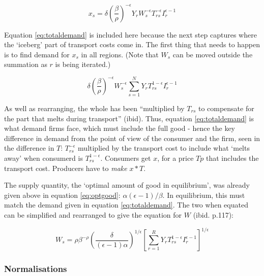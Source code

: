 {\begin{equation}
x_{s} = \delta \left(\frac{\beta}{\rho}\right)^{-\epsilon} Y_{r} W_{s}^{-\epsilon} T_{rs}^{-\epsilon} I_{r}^{\epsilon-1}\label{eq:totaldemand}
\end{equation}

Equation \eqref{eq:totaldemand} is included here because the next step captures where the `iceberg' part of transport costs come in. The first thing that needs to happen is to find demand for $x_{s}$ in all regions. (Note that $W_{s}$ can be moved outside the summation as $r$ is being iterated.)

\begin{equation}
\delta \left(\frac{\beta}{\rho}\right)^{-\epsilon} W_{s}^{-\epsilon} \sum_{s=1}^{N} Y_{r} T_{rs}^{1-\epsilon} I_{r}^{\epsilon-1}\label{eq:totaldemand}
\end{equation}

As well as rearranging, the whole has been ``multiplied by $T_{rs}$ to compensate for the part that melts during transport'' (ibid). Thus, equation \eqref{eq:totaldemand} is what demand firms face, which must include the full good - hence the key difference in demand from the point of view of the consumer and the firm, seen in the difference in $T$: $T_{rs}^{-\epsilon}$ multiplied by the transport cost to include what `melts away' when consumerd is $T_{rs}^{1-\epsilon}$. Consumers get $x$, for a price $T p$ that includes the transport cost. Producers have to \emph{make} $x * T$.

The supply quantity, the `optimal amount of good in equilibrium', was already given above in equation \eqref{eq:optgood}: $\alpha(\epsilon - 1)/\beta$. In equilibrium, this must match the demand given in equation \eqref{eq:totaldemand}. The two when equated can be simplified and rearranged to give the equation for $W$ (ibid. p.117):

\begin{equation}
W_{s} = \rho\beta^{-\rho} \left(\frac{\delta}{(\epsilon-1)\alpha}\right)^{1/\epsilon}\left[ \sum_{r=1}^{R} Y_{r}T_{rs}^{1-\epsilon}I_{r}^{\epsilon-1} \right]^{1/\epsilon}\label{eq:fullWequation}
\end{equation}

\subsubsection{Normalisations \label{cm_normalisations}}

}
